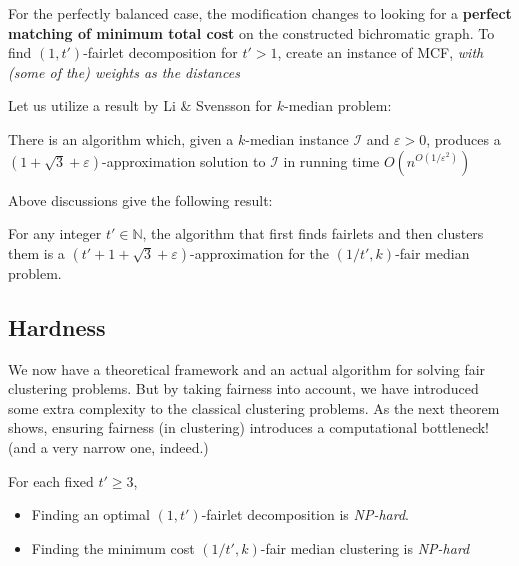 For the perfectly balanced case, the modification changes to looking for a {\bf perfect matching of minimum total cost} on the constructed bichromatic graph.
To find $(1, t')$-fairlet decomposition for $t' > 1$, create an instance of MCF, {\it with (some of the) weights as the distances}
	
Let us utilize a result by Li \& Svensson for $k$-median problem\cite{Li2013}:

\begin{theorem}[Li \& Svensson, 2013]
There is an algorithm which, given a $k$-median instance $\mathcal{I}$ and $\varepsilon > 0$, produces a $(1 + \sqrt{3} + \varepsilon)$-approximation solution to $\mathcal{I}$ in running time $O \left( n^{O(1 / \varepsilon^2)} \right)$

\end{theorem}

\noindent Above discussions give the following result:

\begin{theorem}
For any integer $t' \in \mathbb{N}$, the algorithm that first finds fairlets and then clusters them is a $(t' + 1 + \sqrt{3} + \varepsilon)$-approximation for the $(1/t', k)$-fair median problem.

\end{theorem}


\subsection{Hardness}

We now have a theoretical framework and an actual algorithm for solving fair clustering problems. But by taking fairness into account, we have introduced some extra complexity to the classical clustering problems.
As the next theorem shows, ensuring fairness (in clustering) introduces a computational bottleneck! (and a very narrow one, indeed.)

\begin{theorem}
For each fixed $t' \geq 3$,

\begin{itemize}
	\item Finding an optimal $(1, t')$-fairlet decomposition is {\it NP-hard}.
	\item Finding the minimum cost $(1/t', k)$-fair median clustering is {\it NP-hard}
\end{itemize}

\end{theorem}

